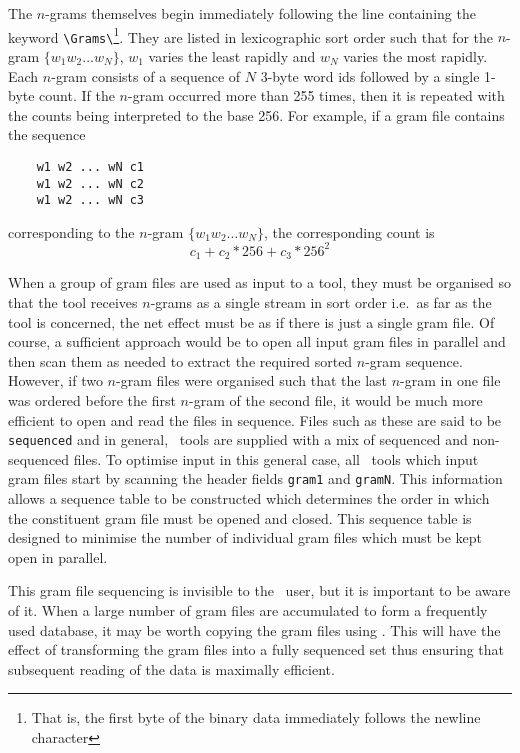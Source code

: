 The $n$-grams themselves begin immediately following the line containing
the keyword \verb+\Grams\+\footnote{That is, the first byte of the
binary data immediately follows the newline character}.  They are
listed in lexicographic sort order such that for the $n$-gram $\{w_1 w_2
\ldots w_N\}$, $w_1$ varies the least rapidly and $w_N$ varies the
most rapidly.  Each $n$-gram consists of a sequence of $N$ 3-byte word
ids followed by a single 1-byte count.  If the $n$-gram occurred more
than 255 times, then it is repeated with the counts being interpreted
to the base 256.  For example, if a gram file contains the
sequence
\begin{verbatim}
    w1 w2 ... wN c1
    w1 w2 ... wN c2
    w1 w2 ... wN c3
\end{verbatim}
corresponding to the $n$-gram $\{w_1 w_2 \ldots w_N\}$, the corresponding
count is
\[
   c_1 + c_2*256 + c_3*256^2
\]

When a group of gram files are used as input to a tool, they
must be organised so that the tool receives $n$-grams as a single stream
in sort order i.e.\ as far as the tool is concerned, the net effect
must be as if there is just a single gram file.  Of course, a sufficient approach would be to open all input gram
files in parallel and then scan them as needed to extract the required
sorted $n$-gram sequence.  However, if two $n$-gram files were organised
such that the last $n$-gram in one file was ordered before the first
$n$-gram of the second file, it would be much more efficient to open and
read the files in sequence. Files such as these are said to be
\texttt{sequenced} and in general, \HTK\ tools are supplied with a mix
of sequenced and non-sequenced files.  To optimise input in this
general case, all \HTK\ tools which input gram files start by scanning
the header fields \texttt{gram1} and 
\texttt{gramN}. This information allows a sequence table to be
constructed which determines the order in which the constituent gram
file must be opened and closed.  This sequence table is designed to
minimise the number of individual gram files which must be kept open
in parallel. 

This gram file sequencing is invisible to the \HTK\ user, but it
is important to be aware of it.  When a large number of gram files are
accumulated to form a frequently used database, it may be worth
copying the gram files using .  This will have the effect of
transforming the gram files into a fully sequenced set thus ensuring
that subsequent reading of the data is maximally efficient.

